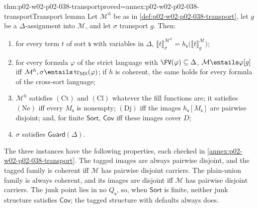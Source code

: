 \begin{hblemma}{thm:p02-w02-p02-038-transport}{proved=annex:p02-w02-p02-038-transport}{Transport lemma}
Let \(\mathcal M^{h}\) be as in \cref{def:p02-w02-p02-038-transport}, let
\(g\) be a \(\Delta\)-assignment into \(\mathcal M\), and let \(\sigma\)
transport \(g\).  Then:
\begin{enumerate}
\item for every term \(t\) of sort \(\mathsf s\) with variables in
      \(\Delta\),
      \(\llbracket t\rrbracket^{\mathcal M^{h}}_{\sigma}=
      h_{\mathsf s}\bigl(\llbracket t\rrbracket^{\mathcal M}_{g}\bigr)\);
\item for every formula \(\varphi\) of the strict language with
      \(\FV(\varphi)\subseteq\Delta\),
      \(\mathcal M\entails\varphi[g]\) iff
      \(\mathcal M^{h},\sigma\entails\operatorname{tr}_{\mathrm{MS}}(\varphi)\);
      if \(h\) is coherent, the same holds for every formula of the
      cross-sort language;
\item \(\mathcal M^{h}\) satisfies \((\mathrm{Ct})\) and \((\mathrm{Cl})\)
      whatever the fill functions are; it satisfies \((\mathrm{Ne})\) iff
      every \(M_{\mathsf s}\) is nonempty; \((\mathrm{Dj})\) iff the images
      \(h_{\mathsf s}[M_{\mathsf s}]\) are pairwise disjoint; and, for
      finite \(\mathsf{Sort}\), \(\mathsf{Cov}\) iff these images cover
      \(D\);
\item \(\sigma\) satisfies \(\mathsf{Guard}(\Delta)\).
\end{enumerate}
\end{hblemma}

The three instances have the following properties, each checked in
\cref{annex:p02-w02-p02-038-transport}.  The tagged images are always
pairwise disjoint, and the tagged family is coherent iff \(\mathcal M\) has
pairwise disjoint carriers.  The plain-union family is always coherent, and
its images are disjoint iff \(\mathcal M\) has pairwise disjoint carriers.
The junk point lies in no \(Q_{\mathsf s}\), so, when \(\mathsf{Sort}\) is
finite, neither junk structure satisfies \(\mathsf{Cov}\); the tagged
structure with defaults always does.

